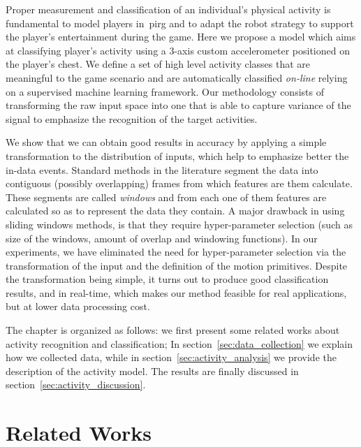 Proper measurement and classification of an individual's physical  activity is fundamental to model players in~\gls{pirg} and to adapt the robot strategy to support the player's entertainment during the game. Here we propose a model which aims at classifying player's activity using a 3-axis custom accelerometer positioned on the player's chest. We define a set of high level activity classes that are meaningful to the game scenario and are automatically classified \textit{on-line} relying on a supervised machine learning framework. Our methodology consists of transforming the raw input space into one that is able to capture variance of the signal to emphasize the recognition of the target activities. 

We show that we can obtain good results in accuracy by applying a simple transformation to the distribution of inputs, which help to emphasize better the in-data events. Standard methods in the literature segment the data into contiguous (possibly overlapping) frames from which features are them calculate. These segments are called \textit{windows} and from each one of them features are calculated so as to represent the data they contain. A major drawback in using sliding windows methods, is that they require hyper-parameter selection (such as size of the windows, amount of overlap and windowing functions). In our experiments, we have eliminated the need for hyper-parameter selection via the transformation of the input and the definition of the motion primitives. Despite the transformation being simple, it turns out to produce good classification results, and in real-time, which makes our method feasible for real applications, but at lower data processing cost.

The chapter is organized as follows: we first present some related works about activity recognition and classification; In section~\ref{sec:data_collection} we explain how we collected data, while in section~\ref{sec:activity_analysis} we provide the description of the activity model. The results are finally discussed in section~\ref{sec:activity_discussion}.

\section{Related Works}\label{sec:act_related_works} %

